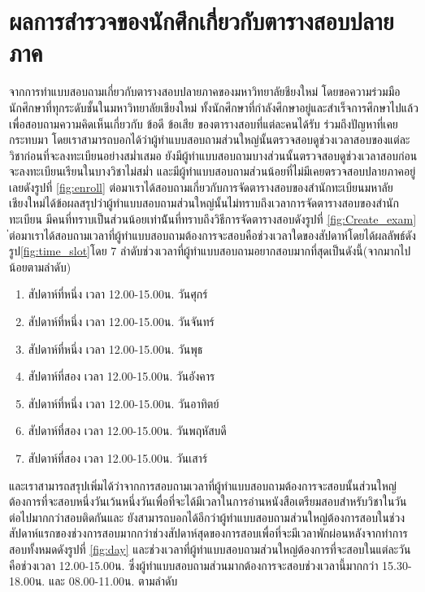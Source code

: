 \section{ผลการสำรวจของนักศึกเกี่ยวกับตารางสอบปลายภาค}
จากการทำแบบสอบถามเกี่ยวกับตารางสอบปลายภาคของมหาวิทยาลัยชียงใหม่ โดยขอความร่วมมือนักศึกษาที่ทุกระดับชั้นในมหาวิทยาลัยเชียงใหม่ 
ทั้งนักศึกษาที่กำลังศึกษาอยู่และสำเร็จการศึกษาไปแล้ว เพื่อสอบถามความคิดเห็นเกี่ยวกับ ข้อดี ข้อเสีย ของตารางสอบที่แต่ละคนได้รับ 
ร่วมถึงปัญหาที่เคยกระทบมา โดยเราสามารถบอกได้ว่าผู้ทำแบบสอบถามส่วนใหญ่นั้นตรวจสอบดูช่วงเวลาสอบของแต่ละวิชาก่อนที่จะลงทะเบียนอย่างสม่ำเสมอ 
ยังมีผู้ทำแบบสอบถามบางส่วนนั้นตรวจสอบดูช่วงเวลาสอบก่อนจะลงทะเบียนเรียนในบางวิชาไม่สม่ำ และมีผู้ทำแบบสอบถามส่วนน้อยที่ไม่มีเคยตรวจสอบปลายภาคอยู่เลยดังรูปที่ \ref{fig:enroll}
ต่อมาเราได้สอบถามเกี่ยวกับการจัดตารางสอบของสำนักทะเบียนมหาลัยเชียงใหม่ได้ข้อผลสรุปว่าผู้ทำแบบสอบถามส่วนใหญ่นั้นไม่ทราบถึงเวลาการจัดตารางสอบของสำนักทะเบียน มีคนที่ทราบเป็นส่วนน้อยเท่าน้ันที่ทราบถึงวิธีการจัดตารางสอบดังรูปที่ \ref{fig:Create_exam} 
่ต่อมาเราได้สอบถามเวลาที่ผู้ทำแบบสอบถามต้องการจะสอบคือช่วงเวลาใดของสัปดาห์โดยได้ผลลัพธ์ดังรูป\ref{fig:time_slot}โดย 7 ลำดับช่วงเวลาที่ผู้ทำแบบสอบถามอยากสอบมากที่สุดเป็นดังนี้(จากมากไปน้อยตามลำดับ)
\begin{enumerate}
  \item สัปดาห์ที่หนึ่ง เวลา 12.00-15.00น. วันศุกร์ 
  \item สัปดาห์ที่หนึ่ง เวลา 12.00-15.00น. วันจันทร์
  \item สัปดาห์ที่หนึ่ง เวลา 12.00-15.00น. วันพุธ
  \item สัปดาห์ที่สอง เวลา 12.00-15.00น. วันอังคาร
  \item สัปดาห์ที่หนึ่ง เวลา 12.00-15.00น. วันอาทิตย์
  \item สัปดาห์ที่สอง เวลา 12.00-15.00น. วันพฤหัสบดี
  \item สัปดาห์ที่สอง เวลา 12.00-15.00น. วันเสาร์
\end{enumerate}
และเราสามารถสรุปเพิ่มได้ว่าจากการสอบถามเวลาที่ผู้ทำแบบสอบถามต้องการจะสอบนั้นส่วนใหญ่ต้องการที่จะสอบหนึ่งวันเว้นหนึ่งวันเพื่อที่จะได้มีเวลาในการอ่านหนังสือเตรียมสอบสำหรับวิชาในวันต่อไปมากกว่าสอบติดกันและ
ยังสามารถบอกได้อีกว่าผู้ทำแบบสอบถามส่วนใหญ่ต้องการสอบในช่วงสัปดาห์แรกของช่วงการสอบมากกว่าช่วงสัปดาห์สุดของการสอบเพื่อที่จะมีเวลาพักผ่อนหลังจากทำการสอบทั้งหมดดังรูปที่ \ref{fig:day}
และช่วงเวลาที่ผู้ทำแบบสอบถามส่วนใหญ่ต้องการที่จะสอบในแต่ละวันคือช่วงเวลา 12.00-15.00น. ซึ่งผู้ทำแบบสอบถามส่วนมากต้องการจะสอบช่วงเวลานี้มากกว่า 15.30-18.00น. และ 08.00-11.00น. ตามลำดับ
